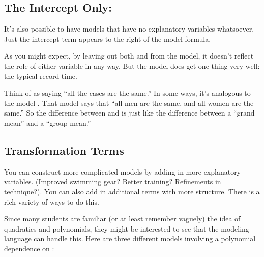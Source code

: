 \subsection{The Intercept Only: }

It's also possible to have models that have no explanatory variables
whatsoever.  Just the intercept term appears to the right of the
model formula. 

\begin{knitrout}
\end{knitrout}


As you might expect, by leaving out both  and  from
the model, it doesn't reflect the role of either variable in any way.
But the model  does get one thing very well: the
typical record time.  

Think of  as saying ``all the cases are the
same.''  In some ways, it's analogous to the model
.  That model says that ``all men are the
same, and all women are the same.''  So the difference between 
 and  is just like the
difference between a ``grand mean'' and a ``group mean.''

\subsection{Transformation Terms}

You can construct more complicated models by adding in more
explanatory variables. (Improved swimming gear?  Better training?
Refinements in technique?).  You can also add in additional terms with
more structure.  There is a rich variety of ways to do this.

Since many students are familiar (or at least remember vaguely) the
idea of quadratics and polynomials, they might be interested to see
that the modeling language can handle this.  Here are three different
models involving a polynomial dependence on :

\begin{knitrout}
\end{knitrout}


